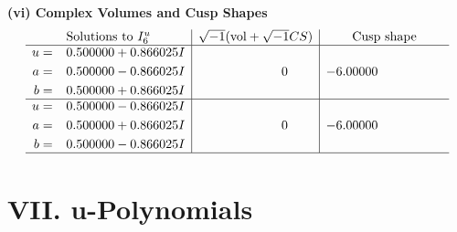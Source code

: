 \documentclass[1p]{elsarticle_modified}
\theoremstyle{definition}
\newcommand{\I}{\sqrt{-1}}
\begin{document}
\newpage\flushleft \textbf{(vi) Complex Volumes and Cusp Shapes}
$$\begin{array}{c|c|c}  
\text{Solutions to }I^u_{6}& \I (\text{vol} + \sqrt{-1}CS) & \text{Cusp shape}\\
 \hline 
\begin{aligned}
u &= \phantom{-}0.500000 + 0.866025 I \\
a &= \phantom{-}0.500000 - 0.866025 I \\
b &= \phantom{-}0.500000 + 0.866025 I\end{aligned}
 & \phantom{-0.000000 } 0 & -6.00000\phantom{ +0.000000I} \\ \hline\begin{aligned}
u &= \phantom{-}0.500000 - 0.866025 I \\
a &= \phantom{-}0.500000 + 0.866025 I \\
b &= \phantom{-}0.500000 - 0.866025 I\end{aligned}
 & \phantom{-0.000000 } 0 & -6.00000\phantom{ +0.000000I}\\
 \hline 
 \end{array}$$\newpage
\newpage\renewcommand{\arraystretch}{1}
\centering \section*{ VII. u-Polynomials}
\end{document}

